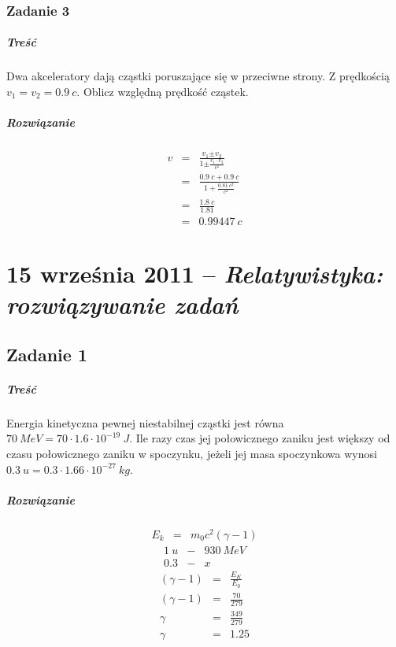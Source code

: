 \documentclass [a4paper, 11pt, oneside]{book}
\begin{document}
		\subsection{Zadanie 3} %
		\label{sub:zadanie_3}
			\paragraph{Treść}
			Dwa akceleratory dają cząstki poruszające się w przeciwne strony. Z prędkością $v_1 = v_2 = 0.9~c$. Oblicz względną prędkość cząstek.
			\paragraph{Rozwiązanie}
			\begin{eqnarray*}
				v & = & \frac{v_1\mathbf{\pm}v_2}{1\mathbf{\pm}\frac{v_1\cdot v_2}{c^2}}\\
				&=& \frac{0.9~c+0.9~c}{1+\frac{0.81~c^2}{c^2}}\\
				&=& \frac{1.8~c}{1.81}\\
				 &=& 0.99447~c
			\end{eqnarray*}
		
		

\chapter{15 września 2011 -- \textit{Relatywistyka: rozwiązywanie zadań}} %
\label{cha:15_wrze_nia_2011_textit}
	\section{Zadanie 1} %
	\label{sec:zadanie_1}
		\paragraph{Treść}Energia kinetyczna pewnej niestabilnej cząstki jest równa $70~MeV = 70\cdot1.6\cdot10^{-19}~J$. Ile razy czas jej połowicznego zaniku jest większy od czasu połowicznego zaniku w spoczynku, jeżeli jej masa spoczynkowa wynosi $0.3~u = 0.3\cdot1.66\cdot10^{-27}~kg$.
		\paragraph{Rozwiązanie}
		\begin{eqnarray*}
			E_k &=& m_0c^2(\gamma-1)
		\end{eqnarray*}
		\[
			\begin{array}{ccc}
				1~u & - & 930~MeV\\
				0.3 & - & x
			\end{array}
		\]
		\begin{eqnarray*}
			(\gamma-1) &=& \frac{E_K}{E_0}\\
			(\gamma-1) & = & \frac{70}{279}\\
			\gamma & = & \frac{349}{279}\\
			\gamma & = & 1.25
		\end{eqnarray*}
\end{document}

